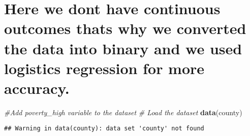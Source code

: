 \documentclass[
]{article}
\newenvironment{Shaded}{\begin{snugshade}}{\end{snugshade}}
\newcommand{\AttributeTok}[1]{\textcolor[rgb]{0.13,0.29,0.53}{#1}}
\newcommand{\CommentTok}[1]{\textcolor[rgb]{0.56,0.35,0.01}{\textit{#1}}}
\newcommand{\DecValTok}[1]{\textcolor[rgb]{0.00,0.00,0.81}{#1}}
\newcommand{\FunctionTok}[1]{\textcolor[rgb]{0.13,0.29,0.53}{\textbf{#1}}}
\newcommand{\NormalTok}[1]{#1}
\newcommand{\OtherTok}[1]{\textcolor[rgb]{0.56,0.35,0.01}{#1}}
\newcommand{\SpecialCharTok}[1]{\textcolor[rgb]{0.81,0.36,0.00}{\textbf{#1}}}
\newcommand{\StringTok}[1]{\textcolor[rgb]{0.31,0.60,0.02}{#1}}
\begin{document}
\hypertarget{here-we-dont-have-continuous-outcomes-thats-why-we-converted-the-data-into-binary-and-we-used-logistics-regression-for-more-accuracy.}{%
\section{Here we dont have continuous outcomes thats why we converted
the data into binary and we used logistics regression for more
accuracy.}\label{here-we-dont-have-continuous-outcomes-thats-why-we-converted-the-data-into-binary-and-we-used-logistics-regression-for-more-accuracy.}}

\begin{Shaded}
\begin{Highlighting}[]
\CommentTok{\#Add poverty\_high variable to the dataset}
\CommentTok{\# Load the dataset}
\FunctionTok{data}\NormalTok{(county)}
\end{Highlighting}
\end{Shaded}

\begin{verbatim}
## Warning in data(county): data set 'county' not found
\end{verbatim}

\begin{Shaded}
\end{Shaded}
\end{document}
